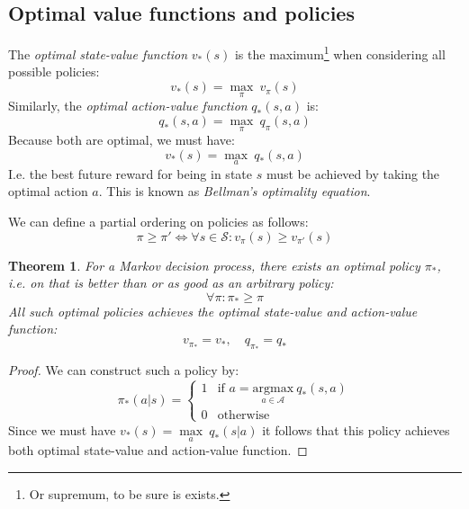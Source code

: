 \documentclass[12pt, a4paper]{article}
\newtheorem{theorem}{Theorem}[section]
\numberwithin{equation}{section}
\begin{document}
\subsection{Optimal value functions and policies}
The \textit{optimal state-value function} $v_*(s)$ is the maximum\footnote{Or supremum, to be sure is exists.} when considering all possible policies:
\begin{equation}
v_*(s)=\underset{\pi}{\max}\ v_\pi(s)
\end{equation}
Similarly, the \textit{optimal action-value function} $q_*(s,a)$ is:
\begin{equation}
q_*(s,a)=\underset{\pi}{\max}\ q_\pi(s,a)
\end{equation}
Because both are optimal, we must have:
\begin{equation}
v_*(s)=\underset{a}{\max}\ q_*(s,a)
\label{optimal_v_maxq}
\end{equation}
I.e. the best future reward for being in state $s$ must be achieved by taking the optimal action $a$. This is known as \textit{Bellman's optimality equation}.

We can define a partial ordering on policies as follows:
\begin{equation}
\pi\ge\pi'\Leftrightarrow\forall s\in\mathcal{S}: v_\pi(s)\ge v_{\pi'}(s)
\end{equation}

\begin{theorem}
For a Markov decision process, there exists an optimal policy $\pi_*$, i.e. on that is better than or as good as an arbitrary policy:
\begin{equation}
\forall\pi: \pi_*\ge\pi
\end{equation}
All such optimal policies achieves the optimal state-value and action-value function:
\begin{equation}
v_{\pi_*}=v_*,\quad q_{\pi_*}=q_*
\end{equation}
\end{theorem}
\begin{proof}
We can construct such a policy by:
\begin{equation}
\pi_*(a|s)=\begin{cases}
1 & \textrm{if } a=\underset{a\in\mathcal{A}}{\textrm{argmax}}\ q_*(s,a) \\
0 & \textrm{otherwise} 
\end{cases}
\end{equation}
Since we must have $v_*(s)=\underset{a}{\max}\ q_*(s|a)$ it follows that this policy achieves both optimal state-value and action-value function.
\end{proof}
\end{document}
